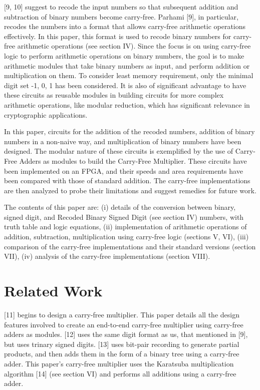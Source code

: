 \documentclass[conference]{IEEEtran}
\begin{document}
[9, 10] suggest to recode the input numbers so that subsequent addition and subtraction of binary numbers become carry-free. Parhami [9], in particular, recodes the numbers into a format that allows carry-free arithmetic operations effectively. In this paper, this format is used to recode binary numbers for carry-free arithmetic operations (see section IV). Since the focus is on using carry-free logic to perform arithmetic operations on binary numbers, the goal is to make arithmetic modules that take binary numbers as input, and perform addition or multiplication on them. To consider least memory requirement, only the minimal digit set {-1, 0, 1} has been considered. It is also of significant advantage to have these circuits as reusable modules in building circuits for more complex arithmetic operations, like modular reduction, which has significant relevance in cryptographic applications.

In this paper, circuits for the addition of the recoded numbers, addition of binary numbers in a non-naive way, and multiplication of binary numbers have been designed. The modular nature of these circuits is exemplified by the use of Carry-Free Adders as modules to build the Carry-Free Multiplier. These circuits have been implemented on an FPGA, and their speeds and area requirements have been compared with those of standard addition. The carry-free implementations are then analyzed to probe their limitations and suggest remedies for future work.

The contents of this paper are: (i) details of the conversion between binary, signed digit, and Recoded Binary Signed Digit (see section IV) numbers, with truth table and logic equations, (ii) implementation of arithmetic operations of addition, subtraction, multiplication using carry-free logic (sections V, VI), (iii) comparison of the carry-free implementations and their standard versions (section VII), (iv) analysis of the carry-free implementations (section VIII).


\section{Related Work}

[11] begins to design a carry-free multiplier. This paper details all the design features involved to create an end-to-end carry-free multiplier using carry-free adders as modules. [12] uses the same digit format as us, that mentioned in [9], but uses trinary signed digits. [13] uses bit-pair recording to generate partial products, and then adds them in the form of a binary tree using a carry-free adder. This paper's carry-free multiplier uses the Karatsuba multiplication algorithm [14] (see section VI) and performs all additions using a carry-free adder.
\end{document}
